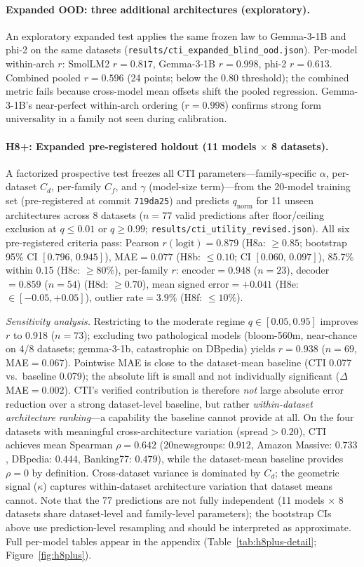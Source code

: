 \documentclass{article}
\begin{document}
\paragraph{Expanded OOD: three additional architectures (exploratory).}
An exploratory expanded test applies the same frozen law to Gemma-3-1B and phi-2 on the same datasets (\texttt{results/cti\_expanded\_blind\_ood.json}).
Per-model within-arch $r$: SmolLM2 $r=0.817$, Gemma-3-1B $r=0.998$, phi-2 $r=0.613$.
Combined pooled $r=0.596$ (24 points; below the 0.80 threshold); the combined metric fails because cross-model mean offsets shift the pooled regression.
Gemma-3-1B's near-perfect within-arch ordering ($r=0.998$) confirms strong form universality in a family not seen during calibration.

\paragraph{H8+: Expanded pre-registered holdout (11 models $\times$ 8 datasets).}
A factorized prospective test freezes all CTI parameters---family-specific $\alpha$, per-dataset $C_d$, per-family $C_f$, and $\gamma$ (model-size term)---from the 20-model training set (pre-registered at commit \texttt{719da25}) and predicts $q_\mathrm{norm}$ for 11 unseen architectures across 8 datasets ($n=77$ valid predictions after floor/ceiling exclusion at $q\leq0.01$ or $q\geq0.99$; \texttt{results/cti\_utility\_revised.json}).
All six pre-registered criteria pass:
Pearson $r(\mathrm{logit})=0.879$ (H8a: $\geq0.85$; bootstrap 95\% CI $[0.796,\,0.945]$),
MAE$=0.077$ (H8b: $\leq0.10$; CI $[0.060,\,0.097]$),
85.7\% within 0.15 (H8c: $\geq80\%$),
per-family $r$: encoder$=0.948$ ($n=23$), decoder$=0.859$ ($n=54$) (H8d: $\geq0.70$),
mean signed error$=+0.041$ (H8e: $\in[-0.05,+0.05]$),
outlier rate$=3.9\%$ (H8f: $\leq10\%$).

\emph{Sensitivity analysis.}
Restricting to the moderate regime $q\in[0.05,0.95]$ improves $r$ to 0.918 ($n=73$); excluding two pathological models (bloom-560m, near-chance on 4/8 datasets; gemma-3-1b, catastrophic on DBpedia) yields $r=0.938$ ($n=69$, MAE$=0.067$).
Pointwise MAE is close to the dataset-mean baseline (CTI 0.077 vs.\ baseline 0.079); the absolute lift is small and not individually significant ($\Delta$MAE$=0.002$).
CTI's verified contribution is therefore \emph{not} large absolute error reduction over a strong dataset-level baseline, but rather \emph{within-dataset architecture ranking}---a capability the baseline cannot provide at all.
On the four datasets with meaningful cross-architecture variation (spread${}>0.20$), CTI achieves mean Spearman $\rho=0.642$ (20newsgroups: $0.912$, Amazon Massive: $0.733$, DBpedia: $0.444$, Banking77: $0.479$), while the dataset-mean baseline provides $\rho=0$ by definition.
Cross-dataset variance is dominated by $C_d$; the geometric signal ($\kappa$) captures within-dataset architecture variation that dataset means cannot.
Note that the 77 predictions are not fully independent (11 models $\times$ 8 datasets share dataset-level and family-level parameters); the bootstrap CIs above use prediction-level resampling and should be interpreted as approximate.
Full per-model tables appear in the appendix (Table~\ref{tab:h8plus-detail}; Figure~\ref{fig:h8plus}).
\end{document}
